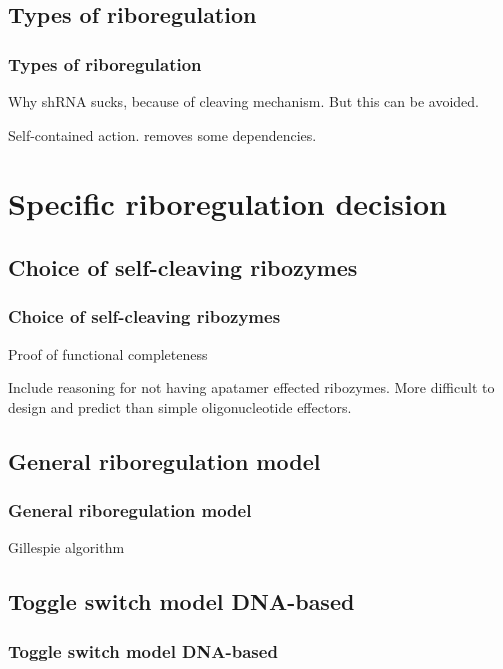 \documentclass{beamer}
\begin{document}

\subsection{Types of riboregulation}
\begin{frame}
\frametitle{Types of riboregulation}

Why shRNA sucks, because of cleaving mechanism. But this can
be avoided.

Self-contained action. removes some dependencies.

\end{frame}

\section{Specific riboregulation decision}
\subsection{Choice of self-cleaving ribozymes}

\begin{frame}
\frametitle{Choice of self-cleaving ribozymes}
Proof of functional completeness

Include reasoning for not having apatamer effected
ribozymes. More difficult to design and predict than
simple oligonucleotide effectors. 
\end{frame}


\subsection{General riboregulation model}
\begin{frame}
\frametitle{General riboregulation model}

Gillespie algorithm

\end{frame}


\subsection{Toggle switch model DNA-based}
\begin{frame}
\frametitle{Toggle switch model DNA-based}
\end{frame}
\end{document}
